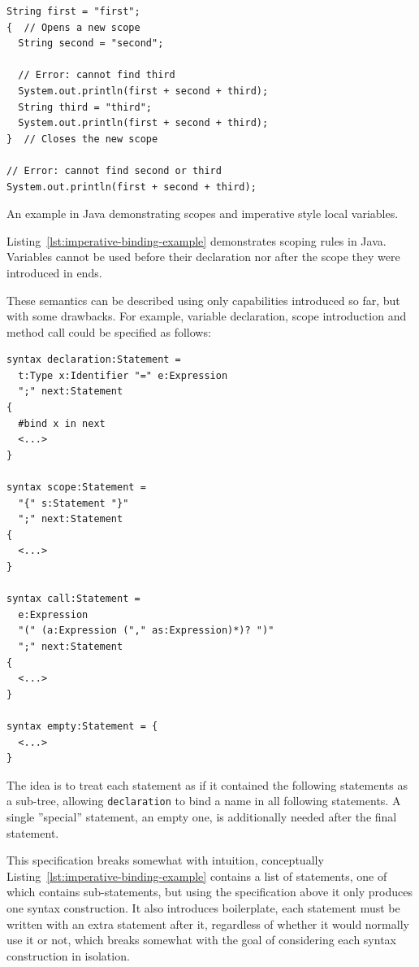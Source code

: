 \documentclass{kththesis}
\begin{document}
\begin{listing}[h]
\begin{verbatim}
String first = "first";
{  // Opens a new scope
  String second = "second";

  // Error: cannot find third
  System.out.println(first + second + third);
  String third = "third";
  System.out.println(first + second + third);
}  // Closes the new scope

// Error: cannot find second or third
System.out.println(first + second + third);
\end{verbatim}
\caption{An example in Java demonstrating scopes and imperative style local variables.}
\label{lst:imperative-binding-example}
\end{listing}

Listing~\ref{lst:imperative-binding-example} demonstrates scoping rules in Java. Variables cannot be used before their declaration nor after the scope they were introduced in ends.

These semantics can be described using only capabilities introduced so far, but with some drawbacks. For example, variable declaration, scope introduction and method call could be specified as follows:

\begin{verbatim}
syntax declaration:Statement =
  t:Type x:Identifier "=" e:Expression
  ";" next:Statement
{
  #bind x in next
  <...>
}

syntax scope:Statement =
  "{" s:Statement "}"
  ";" next:Statement
{
  <...>
}

syntax call:Statement =
  e:Expression
  "(" (a:Expression ("," as:Expression)*)? ")"
  ";" next:Statement
{
  <...>
}

syntax empty:Statement = {
  <...>
}
\end{verbatim}

The idea is to treat each statement as if it contained the following statements as a sub-tree, allowing \texttt{declaration} to bind a name in all following statements. A single ''special'' statement, an empty one, is additionally needed after the final statement.

This specification breaks somewhat with intuition, conceptually Listing~\ref{lst:imperative-binding-example} contains a list of statements, one of which contains sub-statements, but using the specification above it only produces one syntax construction. It also introduces boilerplate, each statement must be written with an extra statement after it, regardless of whether it would normally use it or not, which breaks somewhat with the goal of considering each syntax construction in isolation.
\end{document}
